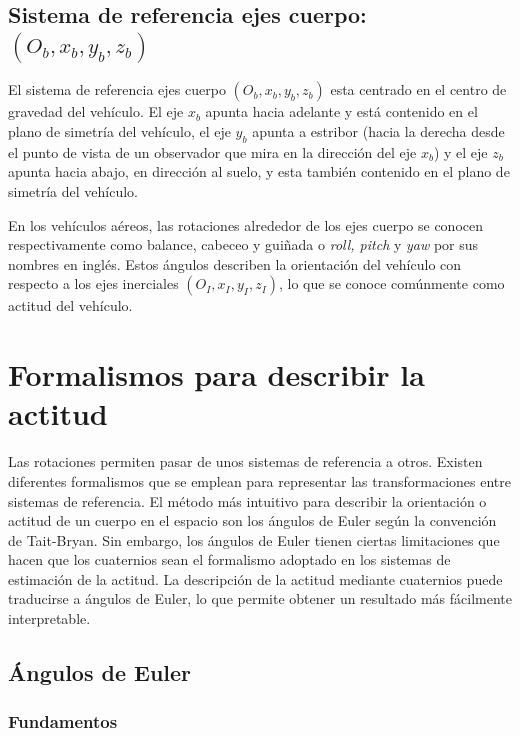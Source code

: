 \documentclass[a4paper,12pt]{book}
\begin{document}
\subsection{Sistema de referencia ejes cuerpo: $(O_b, x_b, y_b, z_b)$ }

El sistema de referencia ejes cuerpo $(O_b, x_b, y_b, z_b)$ esta centrado en el centro de gravedad del vehículo. El eje $x_b$ apunta hacia adelante y está contenido en el plano de simetría del vehículo, el eje $y_b$ apunta a estribor (hacia la derecha desde el punto de vista de un observador que mira en la dirección del eje $x_b$) y el eje $z_b$ apunta hacia abajo, en dirección al suelo, y esta también contenido en el plano de simetría del vehículo.

En los vehículos aéreos, las rotaciones alrededor de los ejes cuerpo se conocen respectivamente como balance, cabeceo y guiñada o \emph{roll, pitch} y \emph{yaw} por sus nombres en inglés. Estos ángulos describen la orientación del vehículo con respecto a los ejes inerciales $(O_I, x_I, y_I, z_I)$, lo que se conoce comúnmente como actitud del vehículo.


\section{Formalismos para describir la actitud}



Las rotaciones permiten pasar de unos sistemas de referencia a otros. Existen diferentes formalismos que se emplean para representar las transformaciones entre sistemas de referencia. El método más intuitivo para describir la orientación o actitud de un cuerpo en el espacio son los ángulos de Euler según la convención de Tait-Bryan. Sin embargo, los ángulos de Euler tienen ciertas limitaciones que hacen que los cuaternios sean el formalismo adoptado en los sistemas de estimación de la actitud. La descripción de la actitud mediante cuaternios puede traducirse a ángulos de Euler, lo que permite obtener un resultado más fácilmente interpretable.

\subsection{Ángulos de Euler}

\subsubsection{Fundamentos}
\end{document}
